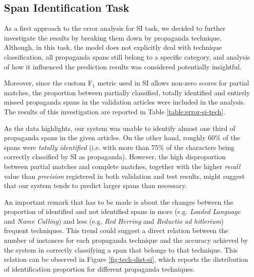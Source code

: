 \documentclass[11pt]{article}
\newcommand{\pol}[1]{{\fontfamily{pcr}\selectfont#1}}
\begin{document}
\subsection{Span Identification Task} \label{sec:si-error-analysis}
As a first approach to the error analysis for \pol{SI} task, we decided to further investigate the results by breaking them down by propaganda technique. Although, in this task, the model does not explicitly deal with technique classification, all propaganda spans still belong to a specific category, and analysis of how it influenced the prediction results was considered potentially insightful.

Moreover, since the custom F$_1$ metric used in \pol{SI} allows non-zero scores for partial matches, the proportion between partially classified, totally identified and entirely missed propaganda spans in the validation articles were included in the analysis. The results of this investigation are reported in Table \ref{table:error-si-tech}. 

As the data highlights, our system was unable to identify almost one third of propaganda spans in the given articles. On the other hand, roughly $60\%$ of the spans were \textit{totally identified} (i.e. with more than 75\% of the characters being correctly classified by \pol{SI} as propaganda). However, the high disproportion between partial matches and complete matches, together with the higher \textit{recall} value than \textit{precision} registered in both validation and test results, might suggest that our system tends to predict larger spans than necessary.

An important remark that has to be made is about the changes between the proportion of identified and not identified spans in more (e.g. \textit{Loaded Language} and \textit{Name Calling}) and less (e.g. \textit{Red Herring} and \textit{Reductio ad hitlerium}) frequent techniques. This trend could suggest a direct relation between the number of instances for each propaganda technique and the accuracy achieved by the system in correctly classifying a span that belongs to that technique. This relation can be observed in Figure \ref{fig:tech-dist-si}, which reports the distribution of identification proportion for different propaganda techniques.\\
\end{document}
